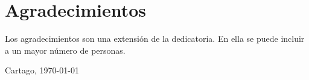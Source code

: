 \chapter*{Agradecimientos}
\thispagestyle{empty}

Los agradecimientos son una extensión de la dedicatoria. En ella se 
puede incluir a un mayor número de personas.

\vspace*{1cm}

\scriptAuthor

Cartago, \today

\cleardoublepage

